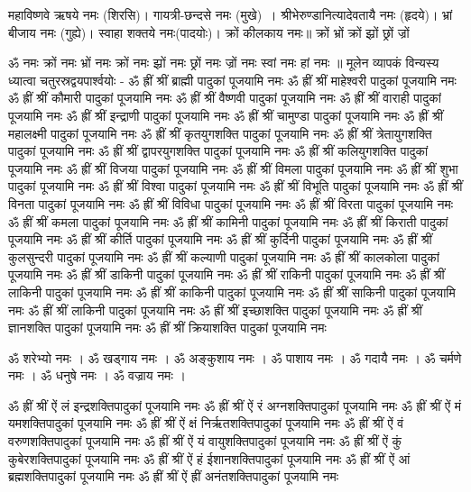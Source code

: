 महाविष्णवे ऋषये नमः (शिरसि)। गायत्री-छन्दसे नमः (मुखे)~। श्रीभेरुण्डानित्यादेवतायै नमः (हृदये)। भ्रां बीजाय नमः (गुह्ये)। स्वाहा शक्तये नमः(पादयोः)।
क्रों कीलकाय नमः॥
क्रों भ्रों क्रों झ्रों छ्रों ज्रों 

ॐ नमः क्रों नमः भ्रों नमः क्रों नमः झ्रों नमः छ्रों नमः ज्रों नमः स्वां नमः हां नमः ॥
मूलेन व्यापकं विन्यस्य ध्यात्वा चतुरस्रद्वयपार्श्वयोः -
ॐ ह्रीं श्रीं ब्राह्मी पादुकां पूजयामि नमः
ॐ ह्रीं श्रीं माहेश्वरी पादुकां पूजयामि नमः
ॐ ह्रीं श्रीं कौमारी पादुकां पूजयामि नमः
ॐ ह्रीं श्रीं वैष्णवी पादुकां पूजयामि नमः
ॐ ह्रीं श्रीं वाराही पादुकां पूजयामि नमः
ॐ ह्रीं श्रीं इन्द्राणी पादुकां पूजयामि नमः
ॐ ह्रीं श्रीं चामुण्डा पादुकां पूजयामि नमः
ॐ ह्रीं श्रीं महालक्ष्मी पादुकां पूजयामि नमः
ॐ ह्रीं श्रीं कृतयुगशक्ति पादुकां पूजयामि नमः
ॐ ह्रीं श्रीं त्रेतायुगशक्ति पादुकां पूजयामि नमः
ॐ ह्रीं श्रीं द्वापरयुगशक्ति पादुकां पूजयामि नमः
ॐ ह्रीं श्रीं कलियुगशक्ति पादुकां पूजयामि नमः
ॐ ह्रीं श्रीं विजया पादुकां पूजयामि नमः
ॐ ह्रीं श्रीं विमला पादुकां पूजयामि नमः
ॐ ह्रीं श्रीं शुभा पादुकां पूजयामि नमः
ॐ ह्रीं श्रीं विश्वा पादुकां पूजयामि नमः
ॐ ह्रीं श्रीं विभूति पादुकां पूजयामि नमः
ॐ ह्रीं श्रीं विनता पादुकां पूजयामि नमः
ॐ ह्रीं श्रीं विविधा पादुकां पूजयामि नमः
ॐ ह्रीं श्रीं विरता पादुकां पूजयामि नमः
ॐ ह्रीं श्रीं कमला पादुकां पूजयामि नमः
ॐ ह्रीं श्रीं कामिनी पादुकां पूजयामि नमः
ॐ ह्रीं श्रीं किराती पादुकां पूजयामि नमः
ॐ ह्रीं श्रीं कीर्ति पादुकां पूजयामि नमः
ॐ ह्रीं श्रीं कुर्दिनी पादुकां पूजयामि नमः
ॐ ह्रीं श्रीं कुलसुन्दरी पादुकां पूजयामि नमः
ॐ ह्रीं श्रीं कल्याणी पादुकां पूजयामि नमः
ॐ ह्रीं श्रीं कालकोला पादुकां पूजयामि नमः
ॐ ह्रीं श्रीं डाकिनी पादुकां पूजयामि नमः
ॐ ह्रीं श्रीं राकिनी पादुकां पूजयामि नमः
ॐ ह्रीं श्रीं लाकिनी पादुकां पूजयामि नमः
ॐ ह्रीं श्रीं काकिनी पादुकां पूजयामि नमः
ॐ ह्रीं श्रीं साकिनी पादुकां पूजयामि नमः
ॐ ह्रीं श्रीं लाकिनी पादुकां पूजयामि नमः
ॐ ह्रीं श्रीं इच्छाशक्ति पादुकां पूजयामि नमः
ॐ ह्रीं श्रीं ज्ञानशक्ति पादुकां पूजयामि नमः
ॐ ह्रीं श्रीं क्रियाशक्ति पादुकां पूजयामि नमः


ॐ शरेभ्यो नमः ।
ॐ खड्गाय नमः ।
ॐ अङ्कुशाय नमः ।
ॐ पाशाय नमः ।
ॐ गदायै नमः ।
ॐ  चर्मणे नमः ।
ॐ धनुषे नमः ।
ॐ वज्राय नमः ।
 
ॐ ह्रीं श्रीं ऐं लं इन्द्रशक्तिपादुकां पूजयामि नमः
ॐ ह्रीं श्रीं ऐं रं अग्नशक्तिपादुकां पूजयामि नमः
ॐ ह्रीं श्रीं ऐं मं यमशक्तिपादुकां पूजयामि नमः
ॐ ह्रीं श्रीं ऐं क्षं निर्ऋतशक्तिपादुकां पूजयामि नमः
ॐ ह्रीं श्रीं ऐं वं वरुणशक्तिपादुकां पूजयामि नमः
ॐ ह्रीं श्रीं ऐं यं वायुशक्तिपादुकां पूजयामि नमः
ॐ ह्रीं श्रीं ऐं कुं कुबेरशक्तिपादुकां पूजयामि नमः
ॐ ह्रीं श्रीं ऐं हं ईशानशक्तिपादुकां पूजयामि नमः
ॐ ह्रीं श्रीं ऐं आं ब्रह्मशक्तिपादुकां पूजयामि नमः
ॐ ह्रीं श्रीं ऐं ह्रीं अनंतशक्तिपादुकां पूजयामि नमः

